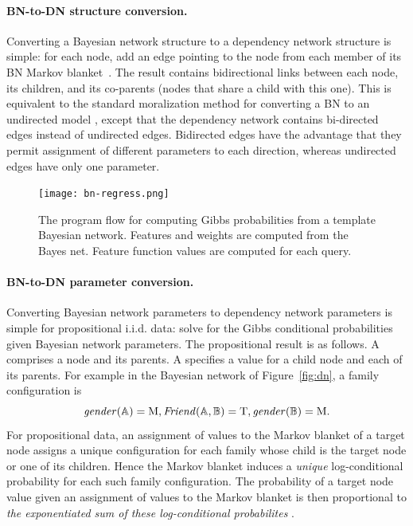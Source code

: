 \documentclass[runningheads,a4paper]{llncs}
\newcommand{\iid}{i.i.d.}
\begin{document}
\paragraph{BN-to-DN structure conversion.}
Converting a Bayesian network structure to a dependency network structure is simple: for each node, add an edge pointing to the node from each member of its BN Markov blanket~\cite{Heckerman2000}.  The result contains  bidirectional links between each node, its children, and its co-parents (nodes that share a child with this one). 
%
This is equivalent to the standard moralization  method for converting a BN to an undirected model \cite{Domingos2009}, except that the dependency network contains bi-directed edges instead of undirected edges. Bidirected edges have the advantage that they permit  assignment of different parameters to each direction, whereas undirected edges have only one parameter.
 
\begin{figure}[t]

\begin{center}
\texttt{[image: bn-regress.png]}
\caption{The program flow for computing Gibbs probabilities from a template Bayesian network. Features and weights are computed from the Bayes net. Feature function values are computed for each query. \label{fig:bn-flow}}
\end{center}

\end{figure}

\paragraph{BN-to-DN parameter conversion.} Converting Bayesian network parameters to dependency network parameters is simple for propositional \iid{} data: solve for the Gibbs conditional probabilities given Bayesian network parameters. The propositional result is as follows. A  comprises a node and its parents. A  specifies a value for a child node and each of its parents. For example in the Bayesian network of Figure~\ref{fig:dn}, a family configuration is 
$$\it{gender}(\mathbb{A}) = \mathrm{M}, \it{Friend}(\mathbb{A},\mathbb{B}) = \mathrm{T}, \it{gender}(\mathbb{B}) = \mathrm{M}.$$
For propositional data, an assignment of values to the Markov blanket of a target node assigns a unique configuration for each family whose child is the target node or one of its children. Hence the Markov blanket induces a {\em unique} log-conditional probability for each such family configuration. The probability of a target node value given an assignment of values to the Markov blanket is then proportional to {\em the exponentiated sum of these log-conditional probabilites} \cite[Ch.14.5.2]{Russell2010}. 
\end{document}
